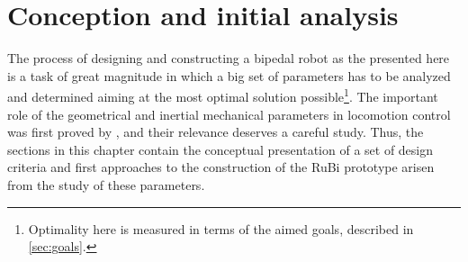 \chapter{Conception and initial analysis} %
\label{cha:analysis}
The process of designing and constructing a bipedal robot as the presented here is a task of great magnitude in which a big set of parameters has to be analyzed and determined aiming at the most optimal solution possible\footnote{Optimality here is measured in terms of the aimed goals, described in \ref{sec:goals}.}.
The important role of the geometrical and inertial mechanical parameters in locomotion control was first proved by \cite{passive_walking}, and their relevance deserves a careful study.
Thus, the sections in this chapter contain the conceptual presentation of a set of design criteria and first approaches to the construction of the RuBi prototype arisen from the study of these parameters.






